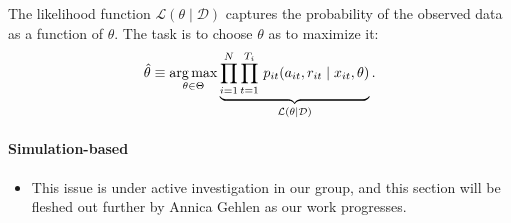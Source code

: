 \noindent The likelihood function $\mathcal{L}(\theta\mid\mathcal{D})$ captures the probability of the observed data as a function of $\theta$. The task is to choose $\theta$ as to maximize it:
%
\begin{align*}
  \hat{\theta} \equiv \operatorname*{arg\,max}_{\theta \in \Theta}  \underbrace{\prod^N_{i= 1} \prod^{T_i}_{t= 1}\, p_{it}(a_{it}, r_{it} \mid x_{it}, \theta)}_{\mathcal{L}(\theta\mid\mathcal{D})}.
\end{align*}

\paragraph{Simulation-based}

\begin{itemize}
  \item This issue is under active investigation in our group, and this section will be fleshed out further by Annica Gehlen as our work progresses.
\end{itemize}
